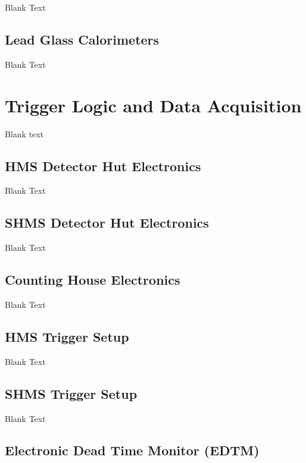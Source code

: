 \documentclass[
]{report}
\begin{document}
Blank Text

\hypertarget{lead-glass-calorimeters}{%
\subsection{Lead Glass Calorimeters}\label{lead-glass-calorimeters}}

Blank Text

\hypertarget{Section-4.7}{%
\section{Trigger Logic and Data Acquisition}\label{Section-4.7}}

Blank text

\hypertarget{hms-detector-hut-electronics}{%
\subsection{HMS Detector Hut
Electronics}\label{hms-detector-hut-electronics}}

Blank Text

\hypertarget{shms-detector-hut-electronics}{%
\subsection{SHMS Detector Hut
Electronics}\label{shms-detector-hut-electronics}}

Blank Text

\hypertarget{counting-house-electronics}{%
\subsection{Counting House
Electronics}\label{counting-house-electronics}}

Blank Text

\hypertarget{hms-trigger-setup}{%
\subsection{HMS Trigger Setup}\label{hms-trigger-setup}}

Blank Text

\hypertarget{shms-trigger-setup}{%
\subsection{SHMS Trigger Setup}\label{shms-trigger-setup}}

Blank Text

\hypertarget{electronic-dead-time-monitor-edtm}{%
\subsection{Electronic Dead Time Monitor
(EDTM)}\label{electronic-dead-time-monitor-edtm}}
\end{document}

